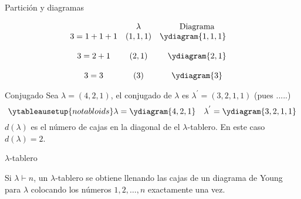 \documentclass[final,xcolor=svgnames]{beamer}
\begin{document}
\begin{frame}{}
\begin{columns}
\begin{column}{0.5\textwidth}
\begin{block}{Partición y diagramas}
\begin{minipage}{0.5\linewidth}
        \end{minipage}
        \begin{minipage}{0.48\linewidth}
          \begin{equation*}
            \begin{array}{cccc}
              & \lambda  &\mbox{Diagrama} \\ %
              3=1+1+1   &  (1,1,1) & \ydiagram{1,1,1} \quad\\ %
              \\ 3=2+1   &   (2,1)  &\ydiagram{2,1} \\ %
              \\ 3=3     &   (3)    &\ydiagram{3} %
            \end{array}
          \end{equation*}
        \end{minipage}
      \end{block}

      \begin{block}{Conjugado}
        Sea $\lambda=(4,2,1)$, el \alert{conjugado de $\lambda$} 
        es $\lambda^{'}=(3,2,1,1)$ (pues .....)
        \begin{equation*}
          \ytableausetup{notabloids} 
          \lambda=\ydiagram{4,2,1} \quad
          \lambda^{'}=\ydiagram{3,2,1,1}
        \end{equation*}
        $d(\lambda)$ es el número de cajas en la diagonal de el
        $\lambda$-tablero. En este caso $d(\lambda)=2$.
      \end{block}
     
      \begin{block}{$\lambda$-tablero}
        \begin{minipage}{0.46\linewidth}
          Si $\lambda\vdash n$, un \alert{$\lambda$-tablero} se
          obtiene llenando las cajas de un diagrama de Young para
          $\lambda$ colocando los números $1,2,\ldots,n$ exactamente
          una vez.
        

\end{minipage}
\end{block}
\end{column}
\end{columns}
\end{frame}
\end{document}
